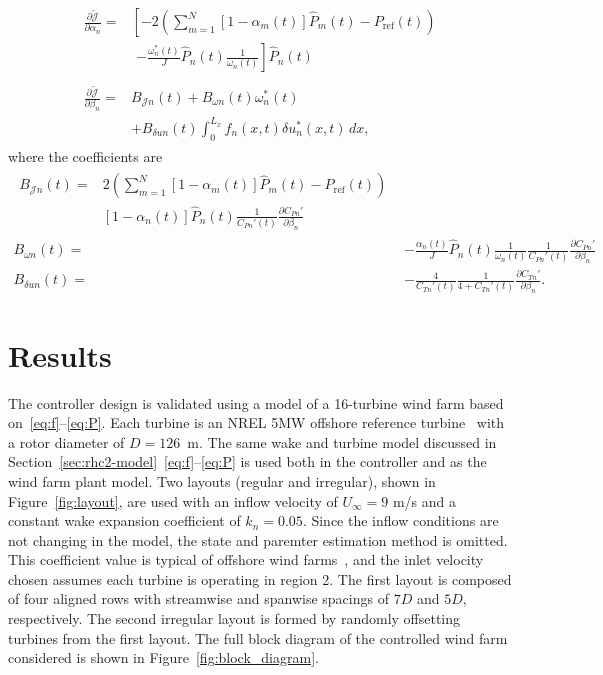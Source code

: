 \begin{align}
\begin{split}
\frac{\partial \tilde{\mathcal{J}}}{\partial \alpha_n}=& \left[-2 \left(\sum_{m=1}^N \left[ 1 - \alpha_m(t) \right] \hat{P}_m(t) - P_\text{ref}(t)  \right) \right.\\
&\, \, \left. - \frac{\omega^*_n(t)}{J} \hat{P}_n(t)\frac{1}{\omega_n(t)}  \right] \hat{P}_n(t)
\end{split}\\
\begin{split}
\frac{\partial \tilde{\mathcal{J}}}{\partial \beta_n}=&B_{\mathcal{J}n}(t) + B_{\omega n}(t) \omega_n^*(t)\\
&+ B_{\delta u n}(t) \int_0^{L_x} f_n(x,t) \delta u_n^*(x,t) \, dx,
\end{split}
\end{align}
where the coefficients are
\begin{align*}
\begin{split}
B_{\mathcal{J}n}(t) =& 2 \left(\sum_{m=1}^N \left[ 1 - \alpha_m(t) \right] \hat{P}_m(t) - P_\text{ref}(t)  \right)\\
& \left[ 1 - \alpha_n(t) \right] \hat{P}_n(t) \frac{1}{C_{Pn}'(t)} \frac{\partial C_{Pn}'}{\partial \beta_n}
\end{split}\\
%
B_{\omega n}(t) =& - \frac{\alpha_n(t)}{J} \hat{P}_n(t)\frac{1}{\omega_n(t)} \frac{1}{C_{Pn}'(t)} \frac{\partial C_{Pn}'}{\partial \beta_n}\\
%
B_{\delta u n}(t) =& - \frac{4}{C_{Tn}'(t)}\frac{1}{4 + C_{Tn}'(t)} \frac{\partial C_{Tn}'}{\partial \beta_n}.
\end{align*}


\section{Results}
\label{sec:rhc2-results}
The controller design is validated using a model of a 16-turbine wind farm based on~\eqref{eq:f}--\eqref{eq:P}. Each turbine is an NREL 5MW offshore reference turbine~\cite{Jonkman2009a} with a rotor diameter of \mbox{$D = 126$ m}. The same wake and turbine model discussed in Section~\ref{sec:rhc2-model}~\eqref{eq:f}--\eqref{eq:P} is used both in the controller and as the wind farm plant model. Two layouts (regular and irregular), shown in Figure~\ref{fig:layout}, are used with an inflow velocity of $U_\infty = 9$ m/s and a constant wake expansion coefficient of $k_n = 0.05$. Since the inflow conditions are not changing in the model, the state and paremter estimation method is omitted. This coefficient value is typical of offshore wind farms~\cite{Barthelmie2010a}, and the inlet velocity chosen assumes each turbine is operating in region 2. The first layout is composed of four aligned rows with streamwise and spanwise spacings of $7D$ and $5D$, respectively. The second irregular layout is formed by randomly offsetting turbines from the first layout. The full block diagram of the controlled wind farm considered is shown in Figure~\ref{fig:block_diagram}. 


